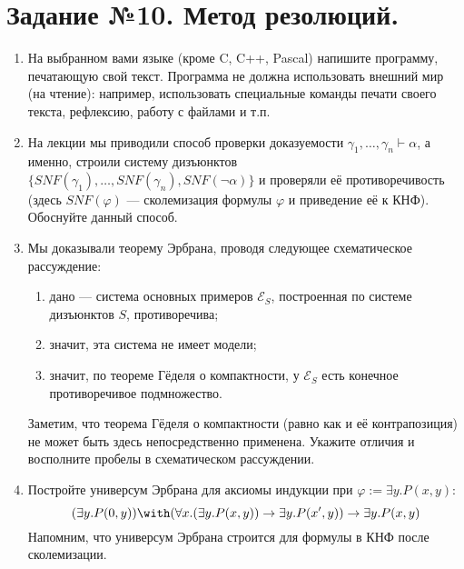 \documentclass[10pt,a4paper,oneside]{article}
\begin{document}
\section*{Задание №10. Метод резолюций.}
\begin{enumerate}
\item На выбранном вами языке (кроме C, C++, Pascal) напишите программу, печатающую свой текст.
Программа не должна использовать внешний мир (на чтение): например, использовать специальные команды
печати своего текста, рефлексию, работу с файлами и т.п.

\item На лекции мы приводили способ проверки доказуемости $\gamma_1,\dots,\gamma_n\vdash\alpha$, а именно, 
строили систему дизъюнктов $\{SNF(\gamma_1),\dots,SNF(\gamma_n),SNF(\neg\alpha)\}$ и проверяли её противоречивость
(здесь $SNF(\varphi)$ --- сколемизация формулы $\varphi$ и приведение её к КНФ).
Обоснуйте данный способ.

\item Мы доказывали теорему Эрбрана, проводя следующее схематическое рассуждение:
\begin{enumerate}
\item дано --- система основных примеров $\mathcal{E}_S$, построенная по системе дизъюнктов $S$, противоречива;
\item значит, эта система не имеет модели;
\item значит, по теореме Гёделя о компактности, у $\mathcal{E}_S$ есть конечное противоречивое подмножество.
\end{enumerate}

Заметим, что теорема Гёделя о компактности (равно как и её контрапозиция) не может быть здесь
непосредственно применена. Укажите отличия и восполните пробелы в схематическом рассуждении.

\item Постройте универсум Эрбрана для аксиомы индукции при $\varphi:=\exists y.P(x,y)$: 
$$(\exists y.P(0,y))\with(\forall x.(\exists y.P(x,y))\rightarrow\exists y.P(x',y))\rightarrow\exists y.P(x,y)$$
Напомним, что универсум Эрбрана строится для формулы в КНФ после сколемизации.


\end{enumerate}
\end{document}

